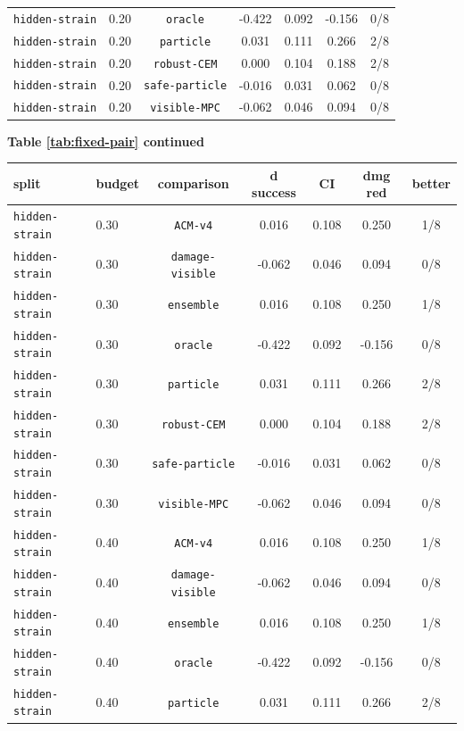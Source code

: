 \documentclass{article}
\begin{document}
\begin{center}
\begin{tabular}{llccccc}
\texttt{hidden-strain} & 0.20 & \texttt{oracle} & -0.422 & 0.092 & -0.156 & 0/8 \\
\texttt{hidden-strain} & 0.20 & \texttt{particle} & 0.031 & 0.111 & 0.266 & 2/8 \\
\texttt{hidden-strain} & 0.20 & \texttt{robust-CEM} & 0.000 & 0.104 & 0.188 & 2/8 \\
\texttt{hidden-strain} & 0.20 & \texttt{safe-particle} & -0.016 & 0.031 & 0.062 & 0/8 \\
\texttt{hidden-strain} & 0.20 & \texttt{visible-MPC} & -0.062 & 0.046 & 0.094 & 0/8 \\
\bottomrule
\end{tabular}
\end{center}
\begin{center}
\textbf{Table \ref{tab:fixed-pair} continued}\\[0.4ex]
\begin{tabular}{llccccc}
\toprule
split & budget & comparison & d success & CI & dmg red & better \\
\midrule
\texttt{hidden-strain} & 0.30 & \texttt{ACM-v4} & 0.016 & 0.108 & 0.250 & 1/8 \\
\texttt{hidden-strain} & 0.30 & \texttt{damage-visible} & -0.062 & 0.046 & 0.094 & 0/8 \\
\texttt{hidden-strain} & 0.30 & \texttt{ensemble} & 0.016 & 0.108 & 0.250 & 1/8 \\
\texttt{hidden-strain} & 0.30 & \texttt{oracle} & -0.422 & 0.092 & -0.156 & 0/8 \\
\texttt{hidden-strain} & 0.30 & \texttt{particle} & 0.031 & 0.111 & 0.266 & 2/8 \\
\texttt{hidden-strain} & 0.30 & \texttt{robust-CEM} & 0.000 & 0.104 & 0.188 & 2/8 \\
\texttt{hidden-strain} & 0.30 & \texttt{safe-particle} & -0.016 & 0.031 & 0.062 & 0/8 \\
\texttt{hidden-strain} & 0.30 & \texttt{visible-MPC} & -0.062 & 0.046 & 0.094 & 0/8 \\
\texttt{hidden-strain} & 0.40 & \texttt{ACM-v4} & 0.016 & 0.108 & 0.250 & 1/8 \\
\texttt{hidden-strain} & 0.40 & \texttt{damage-visible} & -0.062 & 0.046 & 0.094 & 0/8 \\
\texttt{hidden-strain} & 0.40 & \texttt{ensemble} & 0.016 & 0.108 & 0.250 & 1/8 \\
\texttt{hidden-strain} & 0.40 & \texttt{oracle} & -0.422 & 0.092 & -0.156 & 0/8 \\
\texttt{hidden-strain} & 0.40 & \texttt{particle} & 0.031 & 0.111 & 0.266 & 2/8 \\

\end{tabular}
\end{center}
\end{document}

